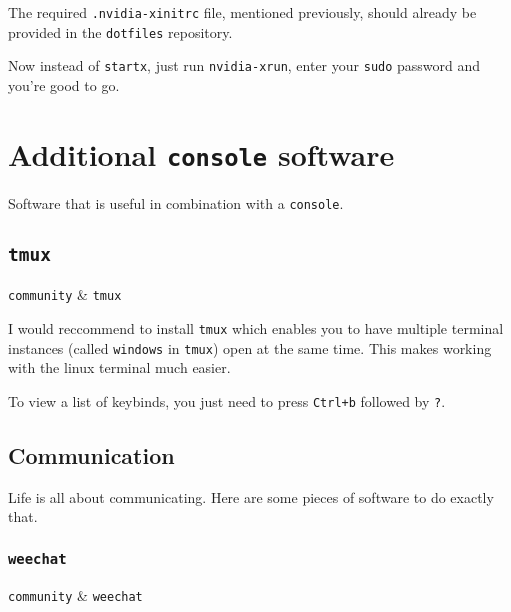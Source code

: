 \documentclass[10pt]{dustdoc}
\begin{document}
\begin{NOTE}
    The required \texttt{.nvidia-xinitrc} file, mentioned previously, should already be provided in the \texttt{dotfiles} repository.
\end{NOTE}

Now instead of \texttt{startx}, just run \texttt{nvidia-xrun}, enter your \texttt{sudo} password and you’re good to go.

\section{Additional \texttt{console} software}
\label{sec:additional-console-software}

Software that is useful in combination with a \texttt{console}.

\subsection{\texttt{tmux}}
\label{sec:tmux}

\begin{packagetable}
    \texttt{community} & \texttt{tmux} \\
\end{packagetable}

I would reccommend to install \texttt{tmux} which enables you to have multiple terminal instances (called \texttt{windows} in \texttt{tmux}) open at the same time.
This makes working with the linux terminal much easier.

\begin{NOTE}
    To view a list of keybinds, you just need to press \texttt{Ctrl+b} followed by \texttt{?}.
\end{NOTE}

\subsection{Communication}
\label{sec:console-communication}

Life is all about communicating.
Here are some pieces of software to do exactly that.

\subsubsection{\texttt{weechat}}
\label{sec:weechat}

\begin{packagetable}
    \texttt{community} & \texttt{weechat} \\
\end{packagetable}
\end{document}
